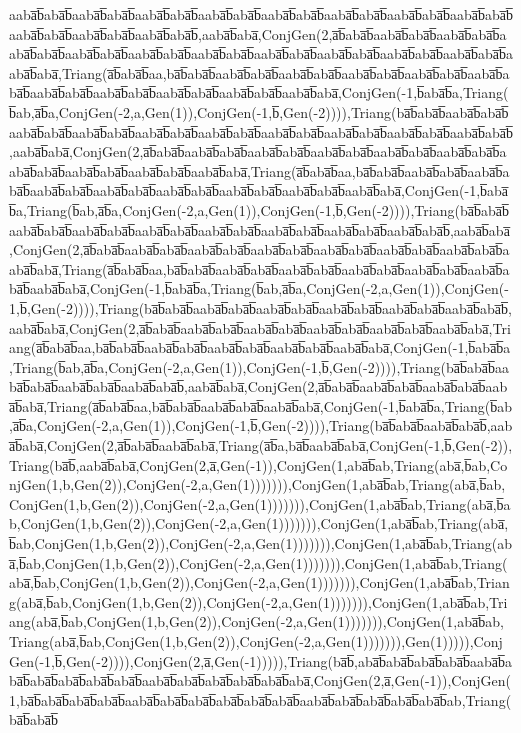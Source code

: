 aaba̅b̅aba̅b̅aaba̅b̅aba̅b̅aaba̅b̅aba̅b̅aaba̅b̅aba̅b̅aaba̅b̅aba̅b̅aaba̅b̅aba̅b̅aaba̅b̅aba̅b̅aaba̅b̅aba̅b̅aaba̅b̅aba̅b̅aaba̅b̅aba̅b̅aaba̅b̅aba̅b̅,aaba̅b̅aba̅,ConjGen(2,a̅b̅aba̅b̅aaba̅b̅aba̅b̅aaba̅b̅aba̅b̅aaba̅b̅aba̅b̅aaba̅b̅aba̅b̅aaba̅b̅aba̅b̅aaba̅b̅aba̅b̅aaba̅b̅aba̅b̅aaba̅b̅aba̅b̅aaba̅b̅aba̅b̅aaba̅b̅aba̅b̅aaba̅b̅aba̅,Triang(a̅b̅aba̅b̅aa,ba̅b̅aba̅b̅aaba̅b̅aba̅b̅aaba̅b̅aba̅b̅aaba̅b̅aba̅b̅aaba̅b̅aba̅b̅aaba̅b̅aba̅b̅aaba̅b̅aba̅b̅aaba̅b̅aba̅b̅aaba̅b̅aba̅b̅aaba̅b̅aba̅b̅aaba̅b̅aba̅,ConjGen(-1,b̅aba̅b̅a,Triang(b̅ab,a̅b̅a,ConjGen(-2,a,Gen(1)),ConjGen(-1,b̅,Gen(-2)))),Triang(ba̅b̅aba̅b̅aaba̅b̅aba̅b̅aaba̅b̅aba̅b̅aaba̅b̅aba̅b̅aaba̅b̅aba̅b̅aaba̅b̅aba̅b̅aaba̅b̅aba̅b̅aaba̅b̅aba̅b̅aaba̅b̅aba̅b̅aaba̅b̅aba̅b̅,aaba̅b̅aba̅,ConjGen(2,a̅b̅aba̅b̅aaba̅b̅aba̅b̅aaba̅b̅aba̅b̅aaba̅b̅aba̅b̅aaba̅b̅aba̅b̅aaba̅b̅aba̅b̅aaba̅b̅aba̅b̅aaba̅b̅aba̅b̅aaba̅b̅aba̅b̅aaba̅b̅aba̅,Triang(a̅b̅aba̅b̅aa,ba̅b̅aba̅b̅aaba̅b̅aba̅b̅aaba̅b̅aba̅b̅aaba̅b̅aba̅b̅aaba̅b̅aba̅b̅aaba̅b̅aba̅b̅aaba̅b̅aba̅b̅aaba̅b̅aba̅b̅aaba̅b̅aba̅,ConjGen(-1,b̅aba̅b̅a,Triang(b̅ab,a̅b̅a,ConjGen(-2,a,Gen(1)),ConjGen(-1,b̅,Gen(-2)))),Triang(ba̅b̅aba̅b̅aaba̅b̅aba̅b̅aaba̅b̅aba̅b̅aaba̅b̅aba̅b̅aaba̅b̅aba̅b̅aaba̅b̅aba̅b̅aaba̅b̅aba̅b̅aaba̅b̅aba̅b̅,aaba̅b̅aba̅,ConjGen(2,a̅b̅aba̅b̅aaba̅b̅aba̅b̅aaba̅b̅aba̅b̅aaba̅b̅aba̅b̅aaba̅b̅aba̅b̅aaba̅b̅aba̅b̅aaba̅b̅aba̅b̅aaba̅b̅aba̅,Triang(a̅b̅aba̅b̅aa,ba̅b̅aba̅b̅aaba̅b̅aba̅b̅aaba̅b̅aba̅b̅aaba̅b̅aba̅b̅aaba̅b̅aba̅b̅aaba̅b̅aba̅b̅aaba̅b̅aba̅,ConjGen(-1,b̅aba̅b̅a,Triang(b̅ab,a̅b̅a,ConjGen(-2,a,Gen(1)),ConjGen(-1,b̅,Gen(-2)))),Triang(ba̅b̅aba̅b̅aaba̅b̅aba̅b̅aaba̅b̅aba̅b̅aaba̅b̅aba̅b̅aaba̅b̅aba̅b̅aaba̅b̅aba̅b̅,aaba̅b̅aba̅,ConjGen(2,a̅b̅aba̅b̅aaba̅b̅aba̅b̅aaba̅b̅aba̅b̅aaba̅b̅aba̅b̅aaba̅b̅aba̅b̅aaba̅b̅aba̅,Triang(a̅b̅aba̅b̅aa,ba̅b̅aba̅b̅aaba̅b̅aba̅b̅aaba̅b̅aba̅b̅aaba̅b̅aba̅b̅aaba̅b̅aba̅,ConjGen(-1,b̅aba̅b̅a,Triang(b̅ab,a̅b̅a,ConjGen(-2,a,Gen(1)),ConjGen(-1,b̅,Gen(-2)))),Triang(ba̅b̅aba̅b̅aaba̅b̅aba̅b̅aaba̅b̅aba̅b̅aaba̅b̅aba̅b̅,aaba̅b̅aba̅,ConjGen(2,a̅b̅aba̅b̅aaba̅b̅aba̅b̅aaba̅b̅aba̅b̅aaba̅b̅aba̅,Triang(a̅b̅aba̅b̅aa,ba̅b̅aba̅b̅aaba̅b̅aba̅b̅aaba̅b̅aba̅,ConjGen(-1,b̅aba̅b̅a,Triang(b̅ab,a̅b̅a,ConjGen(-2,a,Gen(1)),ConjGen(-1,b̅,Gen(-2)))),Triang(ba̅b̅aba̅b̅aaba̅b̅aba̅b̅,aaba̅b̅aba̅,ConjGen(2,a̅b̅aba̅b̅aaba̅b̅aba̅,Triang(a̅b̅a,ba̅b̅aaba̅b̅aba̅,ConjGen(-1,b̅,Gen(-2)),Triang(ba̅b̅,aaba̅b̅aba̅,ConjGen(2,a̅,Gen(-1)),ConjGen(1,aba̅b̅ab,Triang(aba̅,b̅ab,ConjGen(1,b,Gen(2)),ConjGen(-2,a,Gen(1))))))),ConjGen(1,aba̅b̅ab,Triang(aba̅,b̅ab,ConjGen(1,b,Gen(2)),ConjGen(-2,a,Gen(1))))))),ConjGen(1,aba̅b̅ab,Triang(aba̅,b̅ab,ConjGen(1,b,Gen(2)),ConjGen(-2,a,Gen(1))))))),ConjGen(1,aba̅b̅ab,Triang(aba̅,b̅ab,ConjGen(1,b,Gen(2)),ConjGen(-2,a,Gen(1))))))),ConjGen(1,aba̅b̅ab,Triang(aba̅,b̅ab,ConjGen(1,b,Gen(2)),ConjGen(-2,a,Gen(1))))))),ConjGen(1,aba̅b̅ab,Triang(aba̅,b̅ab,ConjGen(1,b,Gen(2)),ConjGen(-2,a,Gen(1))))))),ConjGen(1,aba̅b̅ab,Triang(aba̅,b̅ab,ConjGen(1,b,Gen(2)),ConjGen(-2,a,Gen(1))))))),ConjGen(1,aba̅b̅ab,Triang(aba̅,b̅ab,ConjGen(1,b,Gen(2)),ConjGen(-2,a,Gen(1))))))),ConjGen(1,aba̅b̅ab,Triang(aba̅,b̅ab,ConjGen(1,b,Gen(2)),ConjGen(-2,a,Gen(1))))))),Gen(1))))),ConjGen(-1,b̅,Gen(-2)))),ConjGen(2,a̅,Gen(-1))))),Triang(ba̅b̅,aba̅b̅aba̅b̅aba̅b̅aba̅b̅aaba̅b̅aba̅b̅aba̅b̅aba̅b̅aba̅b̅aba̅b̅aaba̅b̅aba̅b̅aba̅b̅aba̅b̅aba̅b̅aba̅,ConjGen(2,a̅,Gen(-1)),ConjGen(1,ba̅b̅aba̅b̅aba̅b̅aba̅b̅aaba̅b̅aba̅b̅aba̅b̅aba̅b̅aba̅b̅aba̅b̅aaba̅b̅aba̅b̅aba̅b̅aba̅b̅aba̅b̅ab,Triang(ba̅b̅aba̅b̅